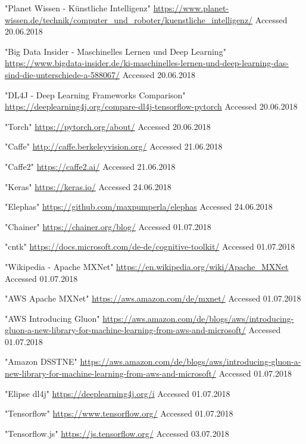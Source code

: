 \documentclass[journal]{IEEEtran}
\begin{document}
\begin{thebibliography}{1}
"Planet Wissen - Künstliche Intelligenz"
\url{https://www.planet-wissen.de/technik/computer_und_roboter/kuenstliche_intelligenz/} 
Accessed 20.06.2018

"Big Data Insider - Maschinelles Lernen und Deep Learning"
\url{https://www.bigdata-insider.de/ki-maschinelles-lernen-und-deep-learning-das-sind-die-unterschiede-a-588067/} 
Accessed 20.06.2018

"DL4J - Deep Learning Frameworks Comparison"
\url{https://deeplearning4j.org/compare-dl4j-tensorflow-pytorch}
Accessed 20.06.2018

"Torch"
\url{https://pytorch.org/about/}
Accessed 20.06.2018

"Caffe"
\url{http://caffe.berkeleyvision.org/}
Accessed 21.06.2018

"Caffe2"
\url{https://caffe2.ai/}
Accessed 21.06.2018

"Keras"
\url{https://keras.io/}
Accessed 24.06.2018

"Elephas"
\url{https://github.com/maxpumperla/elephas}
Accessed 24.06.2018

"Chainer"
\url{https://chainer.org/blog/}
Accessed 01.07.2018

"\acf{cntk}"
\url{https://docs.microsoft.com/de-de/cognitive-toolkit/}
Accessed 01.07.2018

"Wikipedia - Apache MXNet"
\url{https://en.wikipedia.org/wiki/Apache_MXNet}
Accessed 01.07.2018

"AWS Apache MXNet"
\url{https://aws.amazon.com/de/mxnet/}
Accessed 01.07.2018

"AWS Introducing Gluon"
\url{https://aws.amazon.com/de/blogs/aws/introducing-gluon-a-new-library-for-machine-learning-from-aws-and-microsoft/}
Accessed 01.07.2018

"Amazon DSSTNE"
\url{https://aws.amazon.com/de/blogs/aws/introducing-gluon-a-new-library-for-machine-learning-from-aws-and-microsoft/}
Accessed 01.07.2018

"Elipse \acf{dl4j}"
\url{https://deeplearning4j.org/i}
Accessed 01.07.2018

"Tensorflow"
\url{https://www.tensorflow.org/}
Accessed 01.07.2018


"Tensorflow.js"
\url{https://js.tensorflow.org/}
Accessed 03.07.2018





\end{thebibliography}
\end{document}
